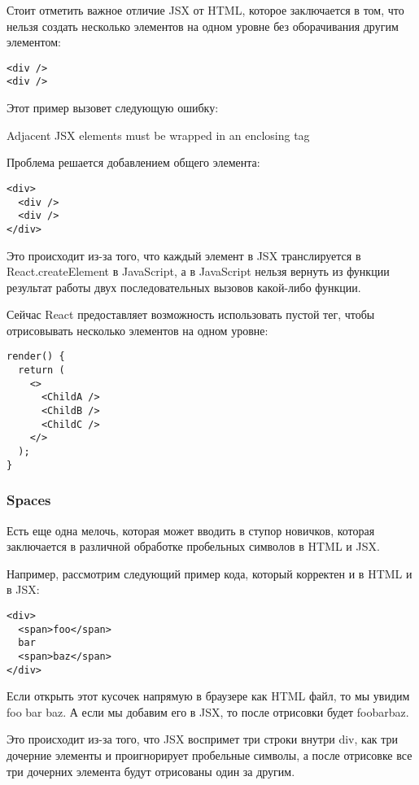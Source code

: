 Стоит отметить важное отличие JSX от HTML, которое заключается в том, что нельзя создать несколько элементов на одном уровне без оборачивания другим элементом:

\begin{lstlisting}
<div />
<div />
\end{lstlisting}

Этот пример вызовет следующую ошибку:

Adjacent JSX elements must be wrapped in an enclosing tag

Проблема решается добавлением общего элемента:

\begin{lstlisting}
<div> 
  <div />
  <div />
</div>
\end{lstlisting}
   
Это происходит из-за того, что каждый элемент в JSX транслируется в React.createElement в JavaScript, а в JavaScript нельзя вернуть из функции результат работы двух последовательных вызовов какой-либо функции.

Сейчас React предоставляет возможность использовать пустой тег, чтобы отрисовывать несколько элементов на одном уровне:

\begin{lstlisting}
render() {
  return (
    <>
      <ChildA />
      <ChildB />
      <ChildC />
    </>
  );
}
\end{lstlisting}
  
\subsubsection{Spaces}   

Есть еще одна мелочь, которая может вводить в ступор новичков, которая заключается в различной обработке пробельных символов в HTML и JSX.

Например, рассмотрим следующий пример кода, который корректен и в HTML и в JSX:

\begin{lstlisting}
<div>
  <span>foo</span>
  bar
  <span>baz</span>
</div>
\end{lstlisting}

Если открыть этот кусочек напрямую в браузере как HTML файл, то мы увидим foo bar baz. А если мы добавим его в JSX, то после отрисовки будет foobarbaz.

Это происходит из-за того, что JSX воспримет три строки внутри div, как три дочерние элементы и проигнорирует пробельные символы, а после отрисовке все три дочерних элемента будут отрисованы один за другим.

